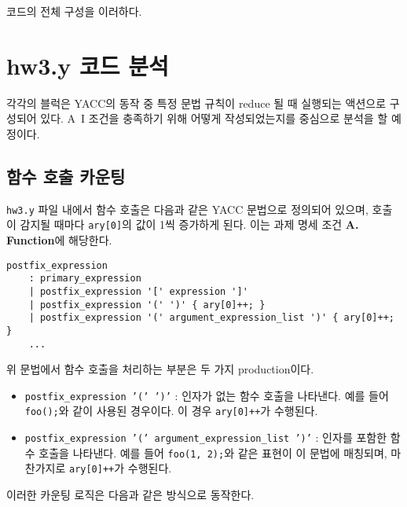 \documentclass{article}
\begin{document}
코드의 전체 구성을 이러하다.


\section{hw3.y 코드 분석}

각각의 블럭은 YACC의 동작 중 특정 문법 규칙이 reduce 될 때 실행되는 액션으로 구성되어 있다.
A~I 조건을 충족하기 위해 어떻게 작성되었는지를 중심으로 분석을 할 예정이다. 



\subsection{함수 호출 카운팅}

\texttt{hw3.y} 파일 내에서 함수 호출은 다음과 같은 YACC 문법으로 정의되어 있으며, 호출이 감지될 때마다 \texttt{ary[0]}의 값이 1씩 증가하게 된다. 이는 과제 명세 조건 \textbf{A. Function}에 해당한다.

\begin{lstlisting}
postfix_expression
    : primary_expression
    | postfix_expression '[' expression ']'
    | postfix_expression '(' ')' { ary[0]++; }
    | postfix_expression '(' argument_expression_list ')' { ary[0]++; }
    ...
\end{lstlisting}

위 문법에서 함수 호출을 처리하는 부분은 두 가지 production이다.

\begin{itemize}
  \item \texttt{postfix\_expression '(' ')'} : 인자가 없는 함수 호출을 나타낸다. 예를 들어 \texttt{foo();}와 같이 사용된 경우이다. 이 경우 \texttt{ary[0]++}가 수행된다.
  \item \texttt{postfix\_expression '(' argument\_expression\_list ')'} : 인자를 포함한 함수 호출을 나타낸다. 예를 들어 \texttt{foo(1, 2);}와 같은 표현이 이 문법에 매칭되며, 마찬가지로 \texttt{ary[0]++}가 수행된다.
\end{itemize}

이러한 카운팅 로직은 다음과 같은 방식으로 동작한다.
\end{document}
